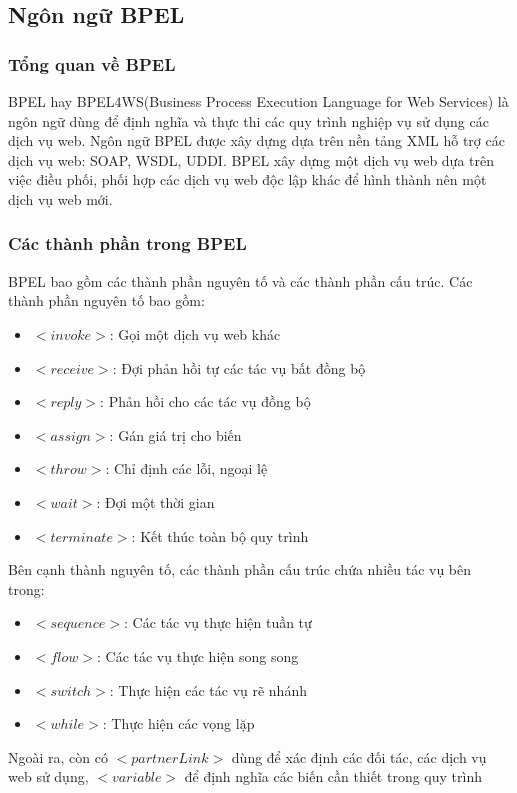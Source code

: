 \subsection{Ngôn ngữ BPEL}
\subsubsection{Tổng quan về BPEL}
\hspace*{0.5cm} BPEL hay BPEL4WS(Business Process Execution Language for Web Services) là ngôn ngữ dùng để định nghĩa và thực thi các quy trình nghiệp vụ sử dụng các dịch vụ web. Ngôn ngữ BPEL được xây dựng dựa trên nền tảng XML hỗ trợ các dịch vụ web: SOAP, WSDL, UDDI. BPEL xây dựng một dịch vụ web dựa trên việc điều phối, phối hợp các dịch vụ web độc lập khác để hình thành nên một dịch vụ web mới.
\subsubsection{Các thành phần trong BPEL}
BPEL bao gồm các thành phần nguyên tố và các thành phần cấu trúc. Các thành phần nguyên tố bao gồm:
\begin{itemize}
	\item $<invoke>$: Gọi một dịch vụ web khác
	\item $<receive>$: Đợi phản hồi tự các tác vụ bất đồng bộ
	\item $<reply>$: Phản hồi cho các tác vụ đồng bộ
	\item $<assign>$: Gán giá trị cho biến
	\item $<throw>$: Chỉ định các lỗi, ngoại lệ
	\item $<wait>$: Đợi một thời gian
	\item $<terminate>$: Kết thúc toàn bộ quy trình
\end{itemize}

Bên cạnh thành nguyên tố, các thành phần cấu trúc chứa nhiều tác vụ bên trong:
\begin{itemize}
	\item $<sequence>$: Các tác vụ thực hiện tuần tự
	\item $<flow>$: Các tác vụ thực hiện song song
	\item $<switch>$: Thực hiện các tác vụ rẽ nhánh
	\item $<while>$: Thực hiện các vọng lặp
\end{itemize}

Ngoài ra, còn có $<partnerLink>$ dùng để xác định các đối tác, các dịch vụ web sử dụng, $<variable>$ để định nghĩa các biến cần thiết trong quy trình



